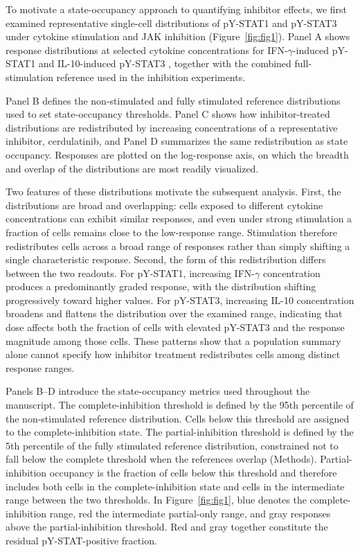 \documentclass[11pt]{article}
\newcommand{\pstatone}{pY-STAT1}
\newcommand{\pstatthree}{pY-STAT3}
\newcommand{\ifng}{IFN-$\gamma$}
\begin{document}
To motivate a state-occupancy approach to quantifying inhibitor effects, we first examined representative single-cell distributions of \pstatone{} and \pstatthree{} under cytokine stimulation and JAK inhibition (Figure~\ref{fig:fig1}). Panel A shows response distributions at selected cytokine concentrations for \ifng{}-induced \pstatone{} and IL-10-induced \pstatthree{} \citep{bhat2018comprehensive,verma2016network}, together with the combined full-stimulation reference used in the inhibition experiments.

Panel B defines the non-stimulated and fully stimulated reference distributions used to set state-occupancy thresholds. Panel C shows how inhibitor-treated distributions are redistributed by increasing concentrations of a representative inhibitor, cerdulatinib, and Panel D summarizes the same redistribution as state occupancy. Responses are plotted on the log-response axis, on which the breadth and overlap of the distributions are most readily visualized.

Two features of these distributions motivate the subsequent analysis. First, the distributions are broad and overlapping: cells exposed to different cytokine concentrations can exhibit similar responses, and even under strong stimulation a fraction of cells remains close to the low-response range. Stimulation therefore redistributes cells across a broad range of responses rather than simply shifting a single characteristic response. Second, the form of this redistribution differs between the two readouts. For \pstatone{}, increasing \ifng{} concentration produces a predominantly graded response, with the distribution shifting progressively toward higher values. For \pstatthree{}, increasing IL-10 concentration broadens and flattens the distribution over the examined range, indicating that dose affects both the fraction of cells with elevated \pstatthree{} and the response magnitude among those cells. These patterns show that a population summary alone cannot specify how inhibitor treatment redistributes cells among distinct response ranges.

Panels B--D introduce the state-occupancy metrics used throughout the manuscript. The complete-inhibition threshold is defined by the 95th percentile of the non-stimulated reference distribution. Cells below this threshold are assigned to the complete-inhibition state. The partial-inhibition threshold is defined by the 5th percentile of the fully stimulated reference distribution, constrained not to fall below the complete threshold when the references overlap (Methods). Partial-inhibition occupancy is the fraction of cells below this threshold and therefore includes both cells in the complete-inhibition state and cells in the intermediate range between the two thresholds. In Figure~\ref{fig:fig1}, blue denotes the complete-inhibition range, red the intermediate partial-only range, and gray responses above the partial-inhibition threshold. Red and gray together constitute the residual pY-STAT-positive fraction.
\end{document}
